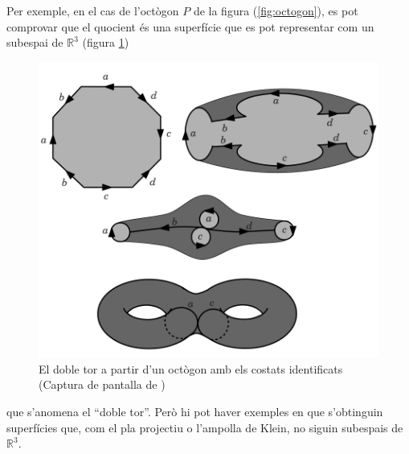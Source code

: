 \documentclass[../main.tex]{subfiles}
\begin{document}
Per exemple, en el cas de l'octògon $P$ de la figura (\ref{fig:octogon}), es pot comprovar que el quocient és una superfície que es pot representar com un subespai de $\mathbb{R}^3$ (figura \ref{fig:transformacionoctogon})
\begin{figure}
    \centering
    \includegraphics[scale = 0.5]{fotos_topo_2/transformacionoctogon.png}
    \caption{El doble tor a partir d'un octògon amb els costats identificats (Captura de pantalla de \cite{aguade})}
    \label{fig:transformacionoctogon}
\end{figure}
que s'anomena el ``doble tor''. Però hi pot haver exemples en que s'obtinguin superfícies que, com el pla projectiu o l'ampolla de Klein, no siguin subespais de $\mathbb{R}^3$.
\end{document}
